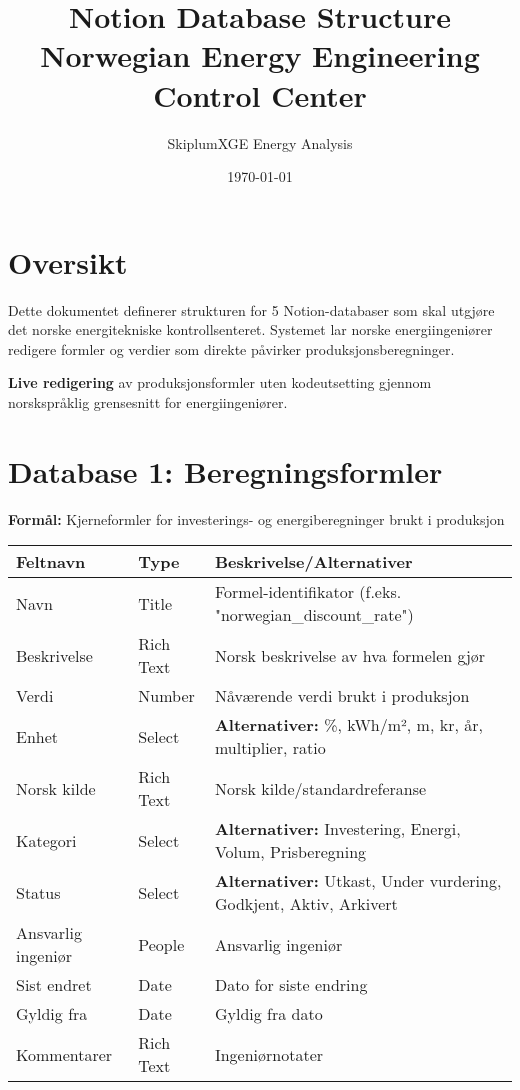 \documentclass[11pt,a4paper]{article}
\title{Notion Database Structure\\
Norwegian Energy Engineering Control Center}
\author{SkiplumXGE Energy Analysis}
\date{\today}
\begin{document}
\maketitle

\section{Oversikt}

Dette dokumentet definerer strukturen for 5 Notion-databaser som skal utgjøre det norske energitekniske kontrollsenteret. Systemet lar norske energiingeniører redigere formler og verdier som direkte påvirker produksjonsberegninger.

\begin{tcolorbox}[colback=primaryblue!10,colframe=primaryblue,title=Hovedformål]
\textbf{Live redigering} av produksjonsformler uten kodeutsetting gjennom norskspråklig grensesnitt for energiingeniører.
\end{tcolorbox}

\section{Database 1: Beregningsformler}

\textbf{Formål:} Kjerneformler for investerings- og energiberegninger brukt i produksjon

\begin{longtable}{@{}p{4cm}p{2.5cm}p{8cm}@{}}
\toprule
\textbf{Feltnavn} & \textbf{Type} & \textbf{Beskrivelse/Alternativer} \\
\midrule
Navn & Title & Formel-identifikator (f.eks. "norwegian\_discount\_rate") \\
\addlinespace
Beskrivelse & Rich Text & Norsk beskrivelse av hva formelen gjør \\
\addlinespace
Verdi & Number & Nåværende verdi brukt i produksjon \\
\addlinespace
Enhet & Select & \textbf{Alternativer:} \%, kWh/m², m, kr, år, multiplier, ratio \\
\addlinespace
Norsk kilde & Rich Text & Norsk kilde/standardreferanse \\
\addlinespace
Kategori & Select & \textbf{Alternativer:} Investering, Energi, Volum, Prisberegning \\
\addlinespace
Status & Select & \textbf{Alternativer:} Utkast, Under vurdering, Godkjent, Aktiv, Arkivert \\
\addlinespace
Ansvarlig ingeniør & People & Ansvarlig ingeniør \\
\addlinespace
Sist endret & Date & Dato for siste endring \\
\addlinespace
Gyldig fra & Date & Gyldig fra dato \\
\addlinespace
Kommentarer & Rich Text & Ingeniørnotater \\
\bottomrule
\end{longtable}
\end{document}
